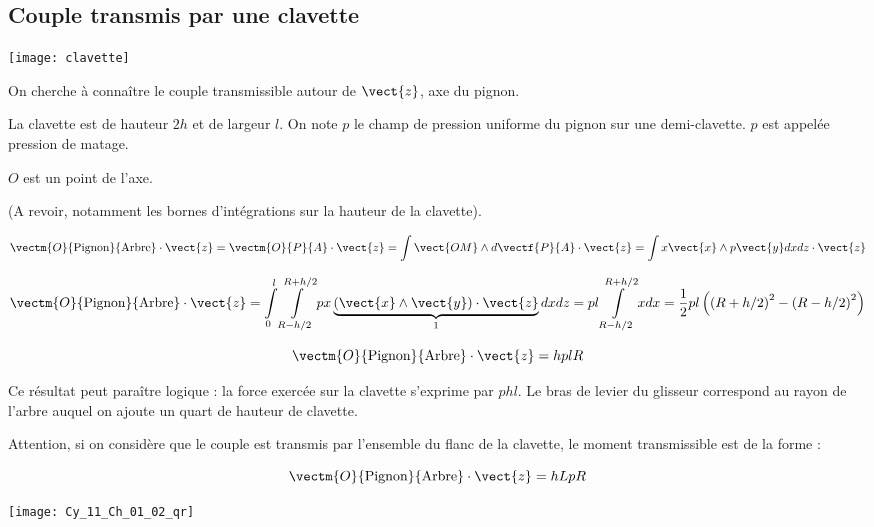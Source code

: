 
\subsection*{Couple transmis par une clavette}


\begin{marginfigure}
\texttt{[image: clavette]}
\end{marginfigure}
On cherche à connaître le couple transmissible autour de $\vect{z}$, axe du pignon.

La clavette est de hauteur $2h$ et de largeur $l$. On note $p$ le champ de pression uniforme du pignon sur une demi-clavette. $p$ est appelée pression de matage. 

$O$ est un point de l'axe.



\ifprof
(A revoir, notamment les bornes d'intégrations sur la hauteur de la clavette).


$$
\vectm{O}{\text{Pignon}}{\text{Arbre}} \cdot \vect{z} = 
\vectm{O}{P}{A} \cdot \vect{z} 
= \int \vect{OM}\wedge d\vectf{P}{A} \cdot \vect{z}
= \int x\vect{x} \wedge p \vect{y}  dx dz \cdot \vect{z}
$$

$$
\vectm{O}{\text{Pignon}}{\text{Arbre}} \cdot \vect{z} 
= \int\limits_{0}^{l}\int\limits_{R-h/2}^{R+h/2} px\underbrace{\left( \vect{x} \wedge  \vect{y}\right)\cdot \vect{z}}_1  dx dz 
= pl\int\limits_{R-h/2}^{R+h/2} x  dx =\dfrac{1}{2}pl\left(\left(R+h/2 \right)^2-\left( R-h/2\right)^2 \right)
$$


$$
\vectm{O}{\text{Pignon}}{\text{Arbre}} \cdot \vect{z} 
=hplR
$$

Ce résultat peut paraître logique : la force exercée sur la clavette s'exprime par $phl$. Le bras de levier du glisseur correspond au rayon de l'arbre auquel on ajoute un quart de hauteur de clavette.


Attention, si on considère que le couple est transmis par l'ensemble du flanc de la clavette, le moment transmissible est de la forme : 

$$
\vectm{O}{\text{Pignon}}{\text{Arbre}} \cdot \vect{z} 
=hLpR
$$
\else
\fi

\ifprof
\else
\begin{marginfigure}
\centering
\texttt{[image: Cy\_11\_Ch\_01\_02\_qr]}
\end{marginfigure}
\fi